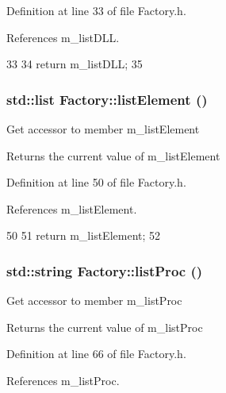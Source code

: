 Definition at line 33 of file Factory.h.

References m\_\-listDLL.


\begin{DoxyCode}
33                        {
34     return m_listDLL;
35   }
\end{DoxyCode}
\hypertarget{classFactory_aca9a1442c4ee2f17ea27db723ce65d90}{
\subsubsection[{listElement}]{\setlength{\rightskip}{0pt plus 5cm}std::list Factory::listElement ()}}
\label{classFactory_aca9a1442c4ee2f17ea27db723ce65d90}
Get accessor to member m\_\-listElement \begin{DoxyReturn}{Returns}
the current value of m\_\-listElement 
\end{DoxyReturn}


Definition at line 50 of file Factory.h.

References m\_\-listElement.


\begin{DoxyCode}
50                          {
51     return m_listElement;
52   }
\end{DoxyCode}
\hypertarget{classFactory_afb222fc976d624fa6fdcb30f0aca586c}{
\subsubsection[{listProc}]{\setlength{\rightskip}{0pt plus 5cm}std::string Factory::listProc ()}}
\label{classFactory_afb222fc976d624fa6fdcb30f0aca586c}
Get accessor to member m\_\-listProc \begin{DoxyReturn}{Returns}
the current value of m\_\-listProc 
\end{DoxyReturn}


Definition at line 66 of file Factory.h.

References m\_\-listProc.


